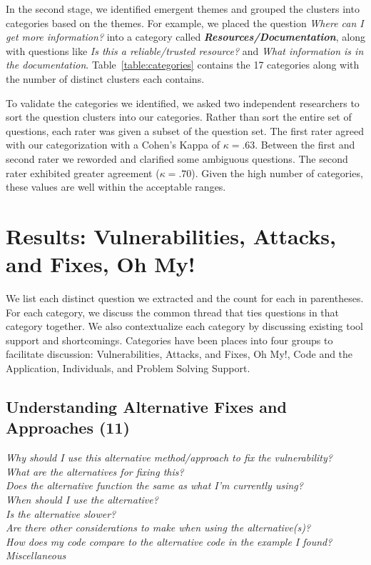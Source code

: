 \documentclass[conference]{IEEEtran}
\begin{document}
In the second stage, we identified emergent themes and grouped the clusters into categories based on the themes. 
For example, we placed the question \textit{Where can I get more information?} into a category called \emph{\textbf{Resources/Documentation}}, along with questions like \textit{Is this a reliable/trusted resource?} and \textit{What information is in the documentation}. 
Table~\ref{table:categories} contains the 17 categories along with the number of distinct clusters each contains. 

To validate the categories we identified, we asked two independent researchers to sort the question clusters into our categories. 
Rather than sort the entire set of questions, each rater was given a subset of the question set. 
The first rater agreed with our categorization with a Cohen's Kappa of $\kappa = .63$. 
Between the first and second rater we reworded and clarified some ambiguous questions. The second rater exhibited greater agreement ($\kappa = .70$). 
Given the high number of categories, these values are well within the acceptable ranges.

\section{Results: Vulnerabilities, Attacks, and Fixes, Oh My!}
\label{sec:results-vaf}
We list each distinct question we extracted and the count for each in parentheses. For each category, we discuss the common thread that ties questions in that category together. 
We also contextualize each category by discussing existing tool support and shortcomings.
Categories have been places into four groups to facilitate discussion: Vulnerabilities, Attacks, and Fixes, Oh My!, Code and the Application, Individuals, and Problem Solving Support.



\noindent\subsection{\textbf{Understanding Alternative Fixes and Approaches (11)}}\label{uafa}

\noindent\emph{Why should I use this alternative method/approach to fix the vulnerability?} \\
\emph{What are the alternatives for fixing this?} \\
\emph{Does the alternative function the same as what I'm currently using?} \\
\emph{When should I use the alternative?} \\
\emph{Is the alternative slower?} \\
\emph{Are there other considerations to make when using the alternative(s)?} \\
\emph{How does my code compare to the alternative code in the example I found?} \\
\emph{Miscellaneous} \\
\end{document}
